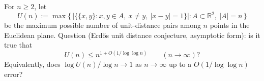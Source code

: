 For $n\ge 2$, let
\[
U(n):=\max\bigl\{\,|\{\{x,y\}: x,y\in A,\ x\ne y,\ |x-y|=1\}| : A\subset\mathbb{R}^2,\ |A|=n\,\bigr\}
\]
be the maximum possible number of unit-distance pairs among $n$ points in the Euclidean plane.
Question (Erd\H{o}s unit distance conjecture, asymptotic form): is it true that
\[
U(n)\le n^{1+O(1/\log\log n)}\qquad (n\to\infty)?
\]
Equivalently, does $\log U(n)/\log n\to 1$ as $n\to\infty$ up to a $O(1/\log\log n)$ error?
